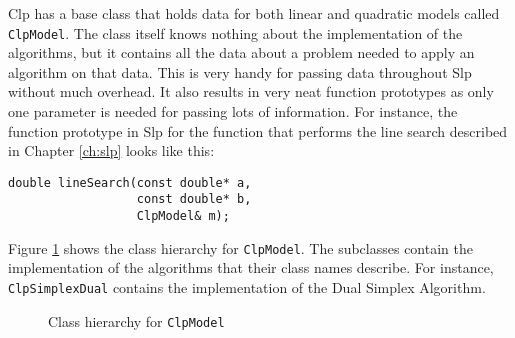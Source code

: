 Clp has a base class that holds data for both linear and quadratic models
called \texttt{ClpModel}.
The class itself knows nothing about the implementation of the algorithms, but
it contains all the data about a problem needed to apply an algorithm on that
data.
This is very handy for passing data throughout Slp without much overhead.
It also results in very neat function prototypes as only one parameter
is needed for passing lots of information. For instance, the function prototype
in Slp for the function that performs the line search described in Chapter
\ref{ch:slp} looks like this:
\begin{verbatim}
double lineSearch(const double* a,
                  const double* b,
                  ClpModel& m);
\end{verbatim}
Figure \ref{fig:clpmodel} shows the class hierarchy for \texttt{ClpModel}.
The subclasses contain the implementation of the algorithms that their class
names describe. For instance, \texttt{ClpSimplexDual} contains the
implementation of the Dual Simplex Algorithm.
\begin{figure}
\centering
{}
\caption{Class hierarchy for \texttt{ClpModel}}
\label{fig:clpmodel}
\end{figure}
